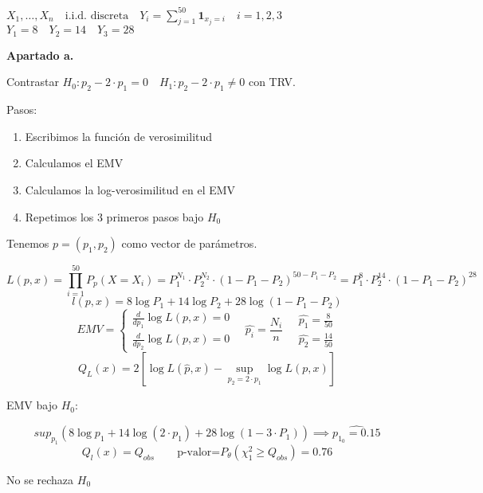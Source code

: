 \(
X_1,\dots,X_n \quad \text{i.i.d. discreta} \quad
Y_i=\sum_{j=1}^{50} \mathbf{1}_{x_j=i} \quad i=1,2,3
\)
\(
Y_1=8 \quad Y_2=14 \quad Y_3=28
\)

\textbf{Apartado a.}

Contrastar $H_0: p_2-2\cdot p_1=0 \quad H_1: p_2-2\cdot p_1 \neq 0$
con TRV.

Pasos:
\begin{enumerate}
    \item Escribimos la función de verosimilitud
    \item Calculamos el EMV
    \item Calculamos la log-verosimilitud en el EMV
    \item Repetimos los 3 primeros pasos bajo $H_0$
\end{enumerate}

Tenemos $p=(p_1,p_2)$ como vector de parámetros.

\[
L(p,x)=\prod_{i=1}^{50} P_p(X=X_i)=P_1^{N_1}\cdot P_2^{N_2}\cdot (1-P_1-P_2)^{50-P_1-P_2}=P_1^8\cdot P_2^{14} \cdot (1-P_1-P_2)^{28}
\]
\[
l(p,x)=8 \log P_1 +14 \log P_2 +28 \log (1-P_1-P_2)
\]
\[
EMV=\left\{
\begin{array}{l}
    \frac{d}{d p_1} \log L(p,x)=0\\
    \frac{d}{d p_2} \log L(p,x)=0
\end{array}
\right.
\quad \hat{p_i}=\frac{N_i}{n}
\quad
\begin{matrix}
    \hat{p_1}=\frac{8}{50}\\
    \hat{p_2}=\frac{14}{50}
\end{matrix}
\]
\[
Q_L(x)=2[\log L(\hat{p},x)-\sup_{p_2=2\cdot p_1}\log L(p,x)]
\]

EMV bajo $H_0$:

\[
sup_{p_1}(8 \log p_1 +14 \log(2\cdot p_1)+28 \log(1-3\cdot P_1))\implies \hat{p_{1_0}=0.15}
\]
\[
Q_l(x)=Q_{obs} \qquad \text{p-valor=}P_\theta(\chi^2_1 \geq Q_{obs})=0.76
\]

No se rechaza $H_0$



